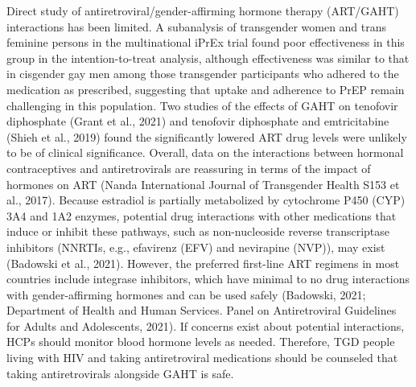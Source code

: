 \documentclass[
]{book}
\begin{document}
Direct study of antiretroviral/gender-affirming
hormone therapy (ART/GAHT) interactions has
been limited. A subanalysis of transgender women
and trans feminine persons in the multinational
iPrEx trial found poor effectiveness in this group
in the intention-to-treat analysis, although effectiveness was similar to that in cisgender gay men
among those transgender participants who
adhered to the medication as prescribed, suggesting that uptake and adherence to PrEP remain
challenging in this population. Two studies of
the effects of GAHT on tenofovir diphosphate
(Grant et al., 2021) and tenofovir diphosphate
and emtricitabine (Shieh et al., 2019) found the
significantly lowered ART drug levels were
unlikely to be of clinical significance. Overall,
data on the interactions between hormonal contraceptives and antiretrovirals are reassuring in
terms of the impact of hormones on ART (Nanda
International Journal of Transgender Health S153
et al., 2017). Because estradiol is partially metabolized by cytochrome P450 (CYP) 3A4 and 1A2
enzymes, potential drug interactions with other
medications that induce or inhibit these pathways, such as non-nucleoside reverse transcriptase
inhibitors (NNRTIs, e.g., efavirenz (EFV) and
nevirapine (NVP)), may exist (Badowski et al.,
2021). However, the preferred first-line ART regimens in most countries include integrase inhibitors, which have minimal to no drug interactions
with gender-affirming hormones and can be used
safely (Badowski, 2021; Department of Health
and Human Services. Panel on Antiretroviral
Guidelines for Adults and Adolescents, 2021). If
concerns exist about potential interactions, HCPs
should monitor blood hormone levels as needed.
Therefore, TGD people living with HIV and taking antiretroviral medications should be counseled that taking antiretrovirals alongside GAHT
is safe.
\end{document}
